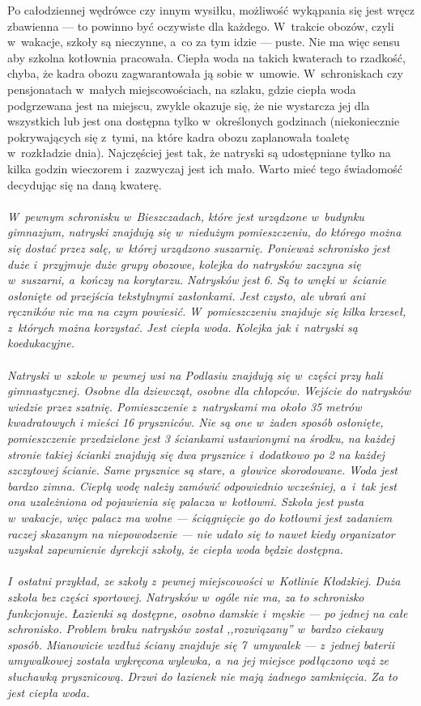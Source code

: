 \documentclass[a5paper,10pt,titlepage,twoside]{article}
\begin{document}
Po całodziennej wędrówce czy innym wysiłku, możliwość wykąpania się jest wręcz zbawienna --- to powinno być oczywiste dla każdego. W~trakcie obozów, czyli w~wakacje, szkoły są nieczynne, a~co za tym idzie --- puste. Nie ma więc sensu aby szkolna kotłownia pracowała. Ciepła woda na takich kwaterach to rzadkość, chyba, że kadra obozu zagwarantowała ją sobie w~umowie. W~schroniskach czy pensjonatach w~małych miejscowościach, na szlaku, gdzie ciepła woda podgrzewana jest na miejscu, zwykle okazuje się, że nie wystarcza jej dla wszystkich lub jest ona dostępna tylko w~określonych godzinach (niekoniecznie pokrywających się z~tymi, na które kadra obozu zaplanowała toaletę w~rozkładzie dnia). Najczęściej jest tak, że natryski są udostępniane tylko na kilka godzin wieczorem i~zazwyczaj jest ich mało. Warto mieć tego świadomość decydując się na daną kwaterę.
\\
\\
\small{
\emph{W~pewnym schronisku w~Bieszczadach, które jest urządzone w~budynku gimnazjum, natryski znajdują się w~niedużym pomieszczeniu, do którego można się dostać przez salę, w~której urządzono suszarnię. Ponieważ schronisko jest duże i~przyjmuje duże grupy obozowe, kolejka do natrysków zaczyna się w~suszarni, a~kończy na korytarzu. Natrysków jest 6. Są to wnęki w~ścianie osłonięte od przejścia tekstylnymi zasłonkami. Jest czysto, ale ubrań ani ręczników nie ma na czym powiesić. W~pomieszczeniu znajduje się kilka krzeseł, z~których można korzystać. Jest ciepła woda. Kolejka jak i~natryski są koedukacyjne.}
\\
\\
\emph{Natryski w~szkole w~pewnej wsi na Podlasiu znajdują się w~części przy hali gimnastycznej. Osobne dla dziewcząt, osobne dla chłopców. Wejście do natrysków wiedzie przez szatnię. Pomieszczenie z~natryskami ma około 35 metrów kwadratowych i mieści 16 pryszniców. Nie są one w~żaden sposób osłonięte, pomieszczenie przedzielone jest 3 ściankami ustawionymi na środku, na każdej stronie takiej ścianki znajdują się dwa prysznice i~dodatkowo po 2 na każdej szczytowej ścianie. Same prysznice są stare, a~głowice skorodowane. Woda jest bardzo zimna. Ciepłą wodę należy zamówić odpowiednio wcześniej, a~i~tak jest ona uzależniona od pojawienia się palacza w~kotłowni. Szkoła jest pusta w~wakacje, więc palacz ma wolne --- ściągnięcie go do kotłowni jest zadaniem raczej skazanym na niepowodzenie --- nie udało się to nawet kiedy organizator uzyskał zapewnienie dyrekcji szkoły, że ciepła woda będzie dostępna.}
\\
\\
\emph{I~ostatni przykład, ze szkoły z~pewnej miejscowości w~Kotlinie Kłodzkiej. Duża szkoła bez części sportowej. Natrysków w~ogóle nie ma, za to schronisko funkcjonuje. Łazienki są dostępne, osobno damskie i~męskie --- po jednej na całe schronisko. Problem braku natrysków został ,,rozwiązany'' w~bardzo ciekawy sposób. Mianowicie wzdłuż ściany znajduje się 7~umywalek --- z~jednej baterii umywalkowej została wykręcona wylewka, a~na jej miejsce podłączono wąż ze słuchawką prysznicową. Drzwi do łazienek nie mają żadnego zamknięcia. Za to jest ciepła woda.}
}
\end{document}
